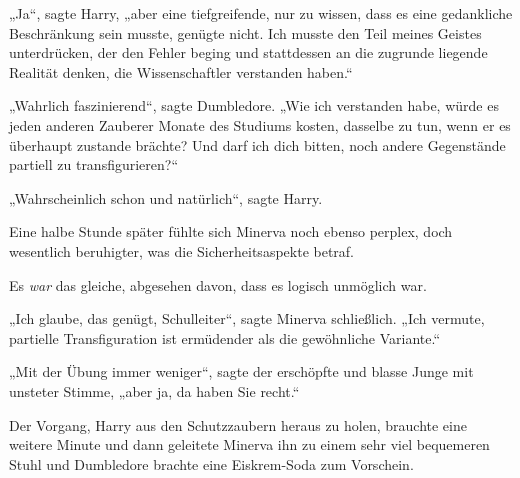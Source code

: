 „Ja“, sagte Harry, „aber eine tiefgreifende, nur zu wissen, dass es eine gedankliche Beschränkung sein musste, genügte nicht. Ich musste den Teil meines Geistes unterdrücken, der den Fehler beging und stattdessen an die zugrunde liegende Realität denken, die Wissenschaftler verstanden haben.“

„Wahrlich faszinierend“, sagte Dumbledore. „Wie ich verstanden habe, würde es jeden anderen Zauberer Monate des Studiums kosten, dasselbe zu tun, wenn er es überhaupt zustande brächte? Und darf ich dich bitten, noch andere Gegenstände partiell zu transfigurieren?“

„Wahrscheinlich schon und natürlich“, sagte Harry.

Eine halbe Stunde später fühlte sich Minerva noch ebenso perplex, doch wesentlich beruhigter, was die Sicherheitsaspekte betraf.

Es \emph{war} das gleiche, abgesehen davon, dass es logisch unmöglich war.

„Ich glaube, das genügt, Schulleiter“, sagte Minerva schließlich. „Ich vermute, partielle Transfiguration ist ermüdender als die gewöhnliche Variante.“

„Mit der Übung immer weniger“, sagte der erschöpfte und blasse Junge mit unsteter Stimme, „aber ja, da haben Sie recht.“

Der Vorgang, Harry aus den Schutzzaubern heraus zu holen, brauchte eine weitere Minute und dann geleitete Minerva ihn zu einem sehr viel bequemeren Stuhl und Dumbledore brachte eine Eiskrem-Soda zum Vorschein.

